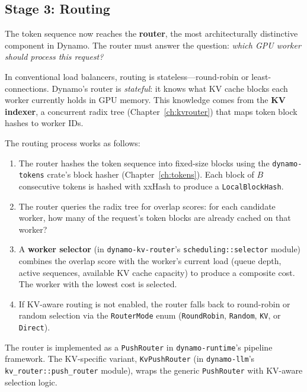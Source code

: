 \subsection{Stage 3: Routing}

%
The token sequence now reaches the \textbf{router}, the most architecturally distinctive component in Dynamo. The router must answer the question: \emph{which GPU worker should process this request?}

In conventional load balancers, routing is stateless---round-robin or least-connections. Dynamo's router is \emph{stateful}: it knows what KV cache blocks each worker currently holds in GPU memory. This knowledge comes from the \textbf{KV indexer}, a concurrent radix tree (Chapter~\ref{ch:kvrouter}) that maps token block hashes to worker IDs.

The routing process works as follows:

\begin{enumerate}
  \item The router hashes the token sequence into fixed-size blocks using the \texttt{dynamo-tokens} crate's block hasher (Chapter~\ref{ch:tokens}). Each block of $B$ consecutive tokens is hashed with xxHash to produce a \texttt{LocalBlockHash}.

  \item The router queries the radix tree for overlap scores: for each candidate worker, how many of the request's token blocks are already cached on that worker?

  \item A \textbf{worker selector} (in \texttt{dynamo-kv-router}'s \texttt{scheduling::selector} module) combines the overlap score with the worker's current load (queue depth, active sequences, available KV cache capacity) to produce a composite cost. The worker with the lowest cost is selected.

  \item If KV-aware routing is not enabled, the router falls back to round-robin or random selection via the \texttt{RouterMode} enum (\texttt{RoundRobin}, \texttt{Random}, \texttt{KV}, or \texttt{Direct}).
\end{enumerate}

The router is implemented as a \texttt{PushRouter} in \texttt{dynamo-runtime}'s pipeline framework. The KV-specific variant, \texttt{KvPushRouter} (in \texttt{dynamo-llm}'s \texttt{kv\_router::push\_router} module), wraps the generic \texttt{PushRouter} with KV-aware selection logic.

